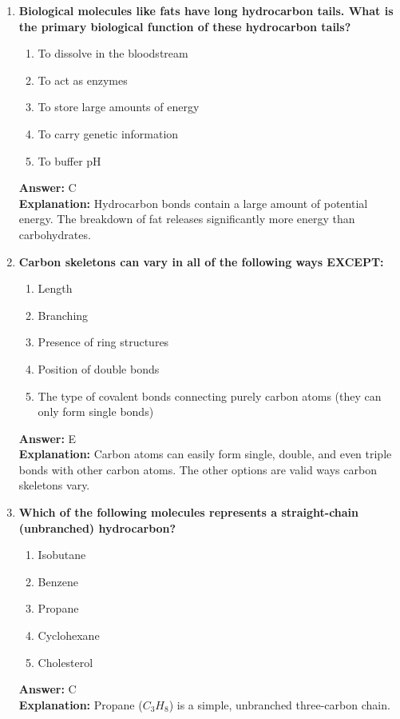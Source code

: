 \documentclass[11pt, a4paper]{article}
\begin{document}
\begin{enumerate}
\item \textbf{Biological molecules like fats have long hydrocarbon tails. What is the primary biological function of these hydrocarbon tails?}
\begin{enumerate}[label=\Alph*.]
    \item To dissolve in the bloodstream
    \item To act as enzymes
    \item To store large amounts of energy
    \item To carry genetic information
    \item To buffer pH
\end{enumerate}
\textbf{Answer:} C \\
\textbf{Explanation:} Hydrocarbon bonds contain a large amount of potential energy. The breakdown of fat releases significantly more energy than carbohydrates.

\item \textbf{Carbon skeletons can vary in all of the following ways EXCEPT:}
\begin{enumerate}[label=\Alph*.]
    \item Length
    \item Branching
    \item Presence of ring structures
    \item Position of double bonds
    \item The type of covalent bonds connecting purely carbon atoms (they can only form single bonds)
\end{enumerate}
\textbf{Answer:} E \\
\textbf{Explanation:} Carbon atoms can easily form single, double, and even triple bonds with other carbon atoms. The other options are valid ways carbon skeletons vary.

\item \textbf{Which of the following molecules represents a straight-chain (unbranched) hydrocarbon?}
\begin{enumerate}[label=\Alph*.]
    \item Isobutane
    \item Benzene
    \item Propane
    \item Cyclohexane
    \item Cholesterol
\end{enumerate}
\textbf{Answer:} C \\
\textbf{Explanation:} Propane ($C_3H_8$) is a simple, unbranched three-carbon chain.


\end{enumerate}
\end{document}
